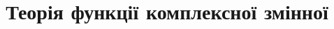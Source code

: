 \documentclass[a4paper,12pt, centered]{bookest}
\title{{Теорія функції комплексної змінної}\thispagestyle{empty}}
\begin{document}
\begin{justify}
	\maketitle
	\let\cleardoublepage\clearpage
	\tableofcontents
	\newpage
	
	
\end{justify}
\end{document}
